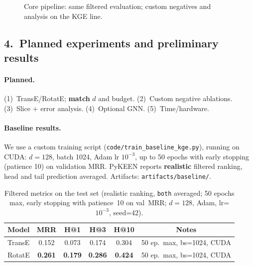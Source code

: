 \documentclass[10pt,a4paper]{article}
\begin{document}
\begin{figure}[h]
\centering
{}
\caption{Core pipeline: same filtered evaluation; custom negatives and analysis on the KGE line.}
\label{fig:method-kg}
\end{figure}

\subsection*{4.\ Planned experiments and preliminary results}
\paragraph{Planned.} (1)~TransE/RotatE; \textbf{match} $d$ and budget. (2)~Custom negative ablations. (3)~Slice $+$ error analysis. (4)~Optional GNN. (5)~Time/hardware.

\paragraph{Baseline results.} We use a custom training script (\texttt{code/train\_baseline\_kge.py}), running on CUDA: $d=128$, batch 1024, Adam lr $10^{-3}$, up to 50 epochs with early stopping (patience 10) on validation MRR. PyKEEN reports \textbf{realistic} filtered ranking, head and tail prediction averaged. Artifacts: \texttt{artifacts/baseline/}.

\begin{table}[h]
\centering
\small
\caption{Filtered metrics on the test set (realistic ranking, \texttt{both} averaged; 50 epochs max, early stopping with patience~10 on val~MRR; $d=128$, Adam, lr=$10^{-3}$, seed=42).}
\begin{tabular}{@{}lccccc@{}}
\toprule
Model & MRR & H@1 & H@3 & H@10 & Notes \\
\midrule
TransE & 0.152 & 0.073 & 0.174 & 0.304 & 50 ep.\ max, bs=1024, CUDA \\
RotatE & \textbf{0.261} & \textbf{0.179} & \textbf{0.286} & \textbf{0.424} & 50 ep.\ max, bs=1024, CUDA \\
\bottomrule
\end{tabular}
\end{table}
\end{document}
